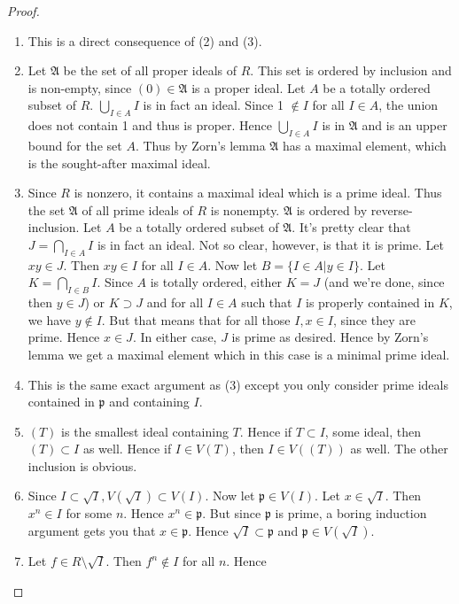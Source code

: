 \begin{proof}
\
\begin{enumerate}
\item This is a direct consequence of (2) and (3).
\item Let $\mathfrak{A}$ be the set of all proper ideals of $R$. This set is
ordered by inclusion and is non-empty, since $(0) \in \mathfrak{A}$ is a proper
ideal. Let $A$ be a totally ordered subset of $R$. $\bigcup_{I \in A} I$ is in
fact an ideal. Since 1 $\notin I$ for all $I \in A$, the union does not contain
1 and thus is proper. Hence $\bigcup_{I \in A} I$ is in $\mathfrak{A}$ and is
an upper bound for the set $A$. Thus by Zorn's lemma $\mathfrak{A}$ has a
maximal element, which is the sought-after maximal ideal.
\item Since $R$ is nonzero, it contains a maximal ideal which is a prime ideal.
Thus the set $\mathfrak{A}$ of all prime ideals of $R$ is nonempty.
$\mathfrak{A}$ is ordered by reverse-inclusion. Let $A$ be a totally ordered
subset of $\mathfrak{A}$. It's pretty clear that $J = \bigcap_{I \in A} I$ is
in fact an ideal. Not so clear, however, is that it is prime. Let $xy \in J$.
Then $xy \in I$ for all $I \in A$. Now let $B = \{I \in A | y \in I\}$. Let $K
= \bigcap_{I \in B} I$. Since $A$ is totally ordered, either $K = J$ (and we're
done, since then $y \in J$) or $K \supset J$ and for all $I \in A$ such that
$I$ is properly contained in $K$, we have $y \notin I$. But that means that for
all those $I, x \in I$, since they are prime. Hence $x \in J$. In either case,
$J$ is prime as desired. Hence by Zorn's lemma we get a maximal element which
in this case is a minimal prime ideal.
\item This is the same exact argument as (3) except you only consider prime
ideals contained in $\mathfrak{p}$ and containing $I$.
\item $(T)$ is the smallest ideal containing $T$. Hence if $T \subset I$, some
ideal, then $(T) \subset I$ as well. Hence if $I \in V(T)$, then $I \in V((T))$
as well. The other inclusion is obvious.
\item Since $I \subset \sqrt{I}, V(\sqrt{I}) \subset V(I)$. Now let
$\mathfrak{p} \in V(I)$. Let $x \in \sqrt{I}$. Then $x^n \in I$ for some $n$.
Hence $x^n \in \mathfrak{p}$. But since $\mathfrak{p}$ is prime, a boring
induction argument gets you that $x \in \mathfrak{p}$. Hence $\sqrt{I} \subset
\mathfrak{p}$ and $\mathfrak{p} \in V(\sqrt{I})$.
\item Let $f \in R \setminus \sqrt{I}$. Then $f^n \notin I$ for all $n$. Hence

\end{enumerate}
\end{proof}
